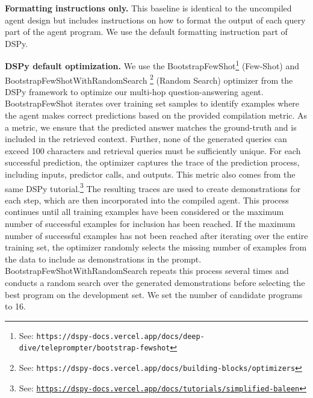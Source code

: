 \documentclass{article}
\begin{document}
\textbf{Formatting instructions only.} This baseline is identical to the uncompiled agent design but includes instructions on how to format the output of each query part of the agent program. We use the default formatting instruction part of DSPy.

\textbf{DSPy default optimization.} We use the BootstrapFewShot\footnote{See: \texttt{{https://dspy-docs.vercel.app/docs/deep-dive/teleprompter/bootstrap-fewshot}}} (Few-Shot) and BootstrapFewShotWithRandomSearch \footnote{See: \texttt{{https://dspy-docs.vercel.app/docs/building-blocks/optimizers}}} (Random Search) optimizer from the DSPy framework to optimize our multi-hop question-answering agent. BootstrapFewShot iterates over training set samples to identify examples where the agent makes correct predictions based on the provided compilation metric. As a metric, we ensure that the predicted answer matches the ground-truth and is included in the retrieved context. Further, none of the generated queries can exceed 100 characters and retrieval queries must be sufficiently unique. For each successful prediction, the optimizer captures the trace of the prediction process, including inputs, predictor calls, and outputs. This metric also comes from the same DSPy tutorial.\footnote{See: \texttt{\url{https://dspy-docs.vercel.app/docs/tutorials/simplified-baleen}}} The resulting traces are used to create demonstrations for each step, which are then incorporated into the compiled agent. This process continues until all training examples have been considered or the maximum number of successful examples for inclusion has been reached. If the maximum number of successful examples has not been reached after iterating over the entire training set, the optimizer randomly selects the missing number of examples from the data to include as demonstrations in the prompt. BootstrapFewShotWithRandomSearch repeats this process several times and conducts a random search over the generated demonstrations before selecting the best program on the development set. We set the number of candidate programs to 16.
\end{document}
